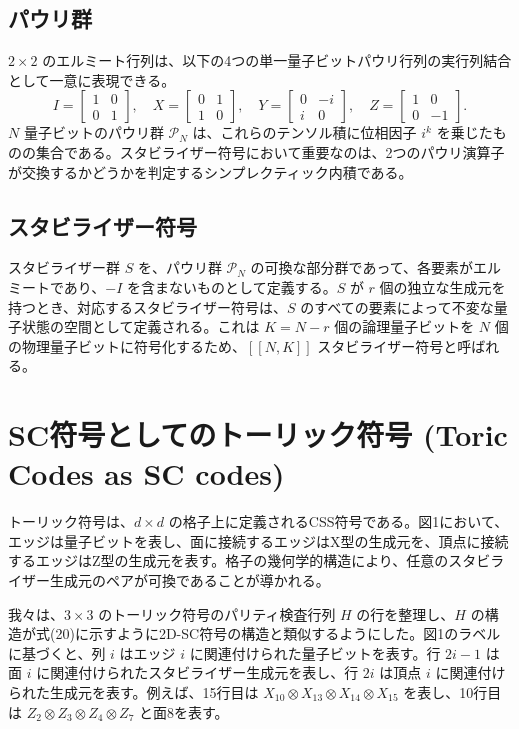 \documentclass[a4paper,11pt]{article}
\begin{document}
\subsection{パウリ群}
$2 \times 2$ のエルミート行列は、以下の4つの単一量子ビットパウリ行列の実行列結合として一意に表現できる。
\begin{equation}
I=\begin{bmatrix}1 & 0 \\ 0 & 1\end{bmatrix}, \quad
X=\begin{bmatrix}0 & 1 \\ 1 & 0\end{bmatrix}, \quad
Y=\begin{bmatrix}0 & -i \\ i & 0\end{bmatrix}, \quad
Z=\begin{bmatrix}1 & 0 \\ 0 & -1\end{bmatrix}.
\end{equation}
$N$ 量子ビットのパウリ群 $\mathcal{P}_N$ は、これらのテンソル積に位相因子 $i^k$ を乗じたものの集合である。スタビライザー符号において重要なのは、2つのパウリ演算子が交換するかどうかを判定するシンプレクティック内積である。

\subsection{スタビライザー符号}
スタビライザー群 $S$ を、パウリ群 $\mathcal{P}_N$ の可換な部分群であって、各要素がエルミートであり、$-I$ を含まないものとして定義する。$S$ が $r$ 個の独立な生成元を持つとき、対応するスタビライザー符号は、$S$ のすべての要素によって不変な量子状態の空間として定義される。これは $K=N-r$ 個の論理量子ビットを $N$ 個の物理量子ビットに符号化するため、$[[N, K]]$ スタビライザー符号と呼ばれる。


\section{SC符号としてのトーリック符号 (Toric Codes as SC codes)}

トーリック符号は、$d \times d$ の格子上に定義されるCSS符号である。図1において、エッジは量子ビットを表し、面に接続するエッジはX型の生成元を、頂点に接続するエッジはZ型の生成元を表す。格子の幾何学的構造により、任意のスタビライザー生成元のペアが可換であることが導かれる。

我々は、$3 \times 3$ のトーリック符号のパリティ検査行列 $H$ の行を整理し、$H$ の構造が式(20)に示すように2D-SC符号の構造と類似するようにした。図1のラベルに基づくと、列 $i$ はエッジ $i$ に関連付けられた量子ビットを表す。行 $2i-1$ は面 $i$ に関連付けられたスタビライザー生成元を表し、行 $2i$ は頂点 $i$ に関連付けられた生成元を表す。例えば、15行目は $X_{10} \otimes X_{13} \otimes X_{14} \otimes X_{15}$ を表し、10行目は $Z_{2} \otimes Z_{3} \otimes Z_{4} \otimes Z_{7}$ と面8を表す。
\end{document}
